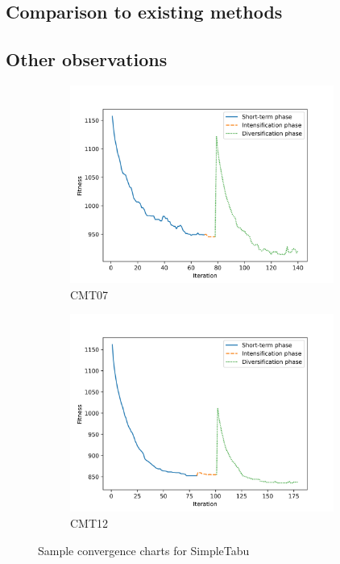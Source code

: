 \documentclass[12pt]{report}
\begin{document}


\subsection{Comparison to existing methods}



\subsection{Other observations}

\begin{figure}[ht]
    \centering
    \begin{subfigure}[b]{0.49\linewidth}
        \centering
        \includegraphics[width=0.95\textwidth]{images/converge_1.jpg}
        \caption{CMT07}
    \end{subfigure}
    \begin{subfigure}[b]{0.49\linewidth}
        \centering
        \includegraphics[width=0.95\textwidth]{images/converge_2.jpg}
        \caption{CMT12}
    \end{subfigure}
    \caption{Sample convergence charts for SimpleTabu}
\end{figure}
\end{document}
